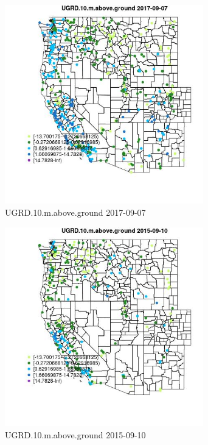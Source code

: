 \begin{figure} 
\centering  
\includegraphics[width=0.77\textwidth]{Code_Outputs/Report_ML_input_PM25_Step4_part_e_de_duplicated_aves_compiled_2019-05-21wNAs_MapObsUGRD10maboveground2017-09-07.jpg} 
\caption{\label{fig:Report_ML_input_PM25_Step4_part_e_de_duplicated_aves_compiled_2019-05-21wNAsMapObsUGRD10maboveground2017-09-07}UGRD.10.m.above.ground 2017-09-07} 
\end{figure} 
 

\begin{figure} 
\centering  
\includegraphics[width=0.77\textwidth]{Code_Outputs/Report_ML_input_PM25_Step4_part_e_de_duplicated_aves_compiled_2019-05-21wNAs_MapObsUGRD10maboveground2015-09-10.jpg} 
\caption{\label{fig:Report_ML_input_PM25_Step4_part_e_de_duplicated_aves_compiled_2019-05-21wNAsMapObsUGRD10maboveground2015-09-10}UGRD.10.m.above.ground 2015-09-10} 
\end{figure} 
 

